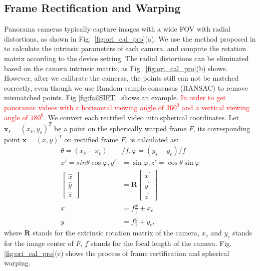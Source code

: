 \documentclass[conference]{IEEEtran}
\begin{document}
\subsection{Frame Rectification and Warping}
\label{ssec:Pre-prepared}

Panorama cameras typically capture images with a wide FOV with radial distortions, as shown in Fig.~\ref{fig:ori_cal_pro}(a).
We use the method proposed in \cite{zhang2000flexible} to calculate the intrinsic parameters of each camera, and compute the rotation matrix according to the device setting. 
%
The radial distortions can be eliminated based on the camera intrinsic matrix, as Fig.~\ref{fig:ori_cal_pro}(b) shows.
However, after we calibrate the cameras, the points still can not be matched correctly, even though we use Random sample consensus (RANSAC) to remove mismatched points. Fig \ref{fig:failSIFT}. shows an example.
\textcolor{red}{In order to get panoramic videos with a horizontal viewing angle of $360^0$ and a vertical viewing angle of $180^0$.}
We convert each rectified video into spherical coordinates.
Let $\mathbf{x}_{s} = (x_{s},y_{s})^T$ be a point on the spherically
warped frame $F$, its corresponding point $\mathbf{x} = (x, y)^T$ on rectified frame $F_r$ is calculated as:
\begin{equation}
\begin{aligned}
\theta =\left(x_{s}-x_{c}\right) &/ f , \varphi =\left(y_{s} -y_{c}\right) / f \\
x'=sin\theta \cos\varphi, y'&=\sin\varphi, z'=\cos\theta \sin\varphi \\
\left[ \begin{array}{l}{\hat{x}} \\ {\hat{y}} \\ {\hat{z}}\end{array}\right]&=\textbf{R} \left[ \begin{array}{l}{x^{\prime}} \\ {y^{\prime}} \\ {z^{\prime}}\end{array}\right]\\
x&=f\frac{\hat{x}}{\hat{z}}+x_c\\
y&=f\frac{\hat{y}}{\hat{z}}+y_c,
\end{aligned}
\end{equation}
where $\textbf{R}$ stands for the extrinsic rotation matrix of the camera, $x_c$ and $y_c$ stands for the image center of $F$, $f$ stands for the focal length of the camera.
Fig. \ref{fig:ori_cal_pro}(c) shows the process of frame rectification and spherical warping. 
\end{document}
